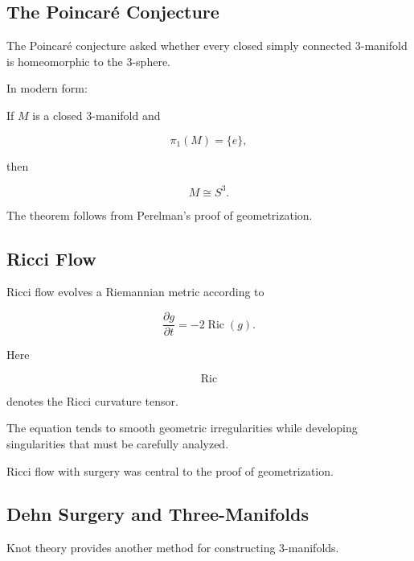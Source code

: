 \subsection{The Poincar\'e Conjecture}
\label{subsec:poincare-conjecture}

The Poincar\'e conjecture asked whether every closed simply connected
\(3\)-manifold is homeomorphic to the \(3\)-sphere.

In modern form:

\begin{theorem}
If \(M\) is a closed \(3\)-manifold and

\[
\pi_1(M)=\{e\},
\]

then

\[
\boxed{
M\cong S^3.
}
\]
\end{theorem}

The theorem follows from Perelman's proof of geometrization.

\subsection{Ricci Flow}
\label{subsec:ricci-flow-low-dimensional}

Ricci flow evolves a Riemannian metric according to

\[
\boxed{
\frac{\partial g}{\partial t}
=
-2\operatorname{Ric}(g).
}
\]

Here

\[
\operatorname{Ric}
\]

denotes the Ricci curvature tensor.

The equation tends to smooth geometric irregularities while developing
singularities that must be carefully analyzed.

Ricci flow with surgery was central to the proof of geometrization.

\subsection{Dehn Surgery and Three-Manifolds}
\label{subsec:dehn-surgery-three-manifolds}

Knot theory provides another method for constructing \(3\)-manifolds.

